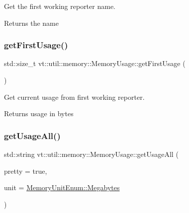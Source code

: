 Get the first working reporter name. 

\begin{DoxyReturn}{Returns}
the name 
\end{DoxyReturn}
\mbox{\label{structvt_1_1util_1_1memory_1_1_memory_usage_ab02282aab80eb52e5f8f43095af05304}} 
\subsubsection{\texorpdfstring{get\+First\+Usage()}{getFirstUsage()}}
{\footnotesize\ttfamily std\+::size\+\_\+t vt\+::util\+::memory\+::\+Memory\+Usage\+::get\+First\+Usage (\begin{DoxyParamCaption}{ }\end{DoxyParamCaption})}



Get current usage from first working reporter. 

\begin{DoxyReturn}{Returns}
usage in bytes 
\end{DoxyReturn}
\mbox{\label{structvt_1_1util_1_1memory_1_1_memory_usage_aa37f5b634fb87151fc1688cdba759298}} 
\subsubsection{\texorpdfstring{get\+Usage\+All()}{getUsageAll()}}
{\footnotesize\ttfamily std\+::string vt\+::util\+::memory\+::\+Memory\+Usage\+::get\+Usage\+All (\begin{DoxyParamCaption}\item[{bool}]{pretty = {\ttfamily true},  }\item[{\hyperlink{namespacevt_1_1util_1_1memory_a64df3d84293b34009f78e2a1db2f9bb6}{Memory\+Unit\+Enum}}]{unit = {\ttfamily \hyperlink{namespacevt_1_1util_1_1memory_a64df3d84293b34009f78e2a1db2f9bb6a2276a1b157f2813f3b65d04c0b1c56f6}{Memory\+Unit\+Enum\+::\+Megabytes}} }\end{DoxyParamCaption})}



